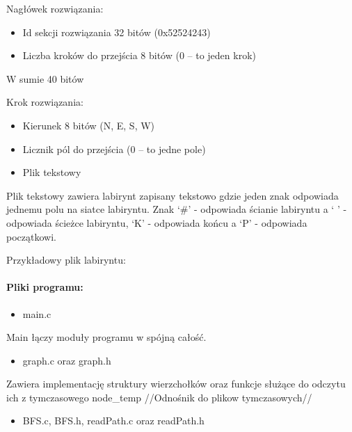 \documentclass[
]{article}
\begin{document}
Nagłówek rozwiązania:

\begin{itemize}
\item
  Id sekcji rozwiązania 32 bitów (0x52524243)
\item
  Liczba kroków do przejścia 8 bitów (0 -- to jeden krok)
\end{itemize}

W sumie 40 bitów

Krok rozwiązania:

\begin{itemize}
\item
  Kierunek 8 bitów (N, E, S, W)
\item
  Licznik pól do przejścia (0 -- to jedne pole)
\end{itemize}

\begin{itemize}
\item
  Plik tekstowy
\end{itemize}

Plik tekstowy zawiera labirynt zapisany tekstowo gdzie jeden znak
odpowiada jednemu polu na siatce labiryntu. Znak `\#' - odpowiada
ścianie labiryntu a ` ' - odpowiada ścieżce labiryntu, `K' - odpowiada
końcu a `P' - odpowiada początkowi.

Przykładowy plik labiryntu:

\hypertarget{pliki-programu}{%
\paragraph{Pliki programu:}\label{pliki-programu}}

\begin{itemize}
\item
  main.c
\end{itemize}

Main łączy moduły programu w spójną całość.

\begin{itemize}
\item
  graph.c oraz graph.h
\end{itemize}

Zawiera implementację struktury wierzchołków oraz funkcje służące do
odczytu ich z tymczasowego node\_temp //Odnośnik do plikow
tymczasowych//

\begin{itemize}
\item
  BFS.c, BFS.h, readPath.c oraz readPath.h
\end{itemize}
\end{document}
